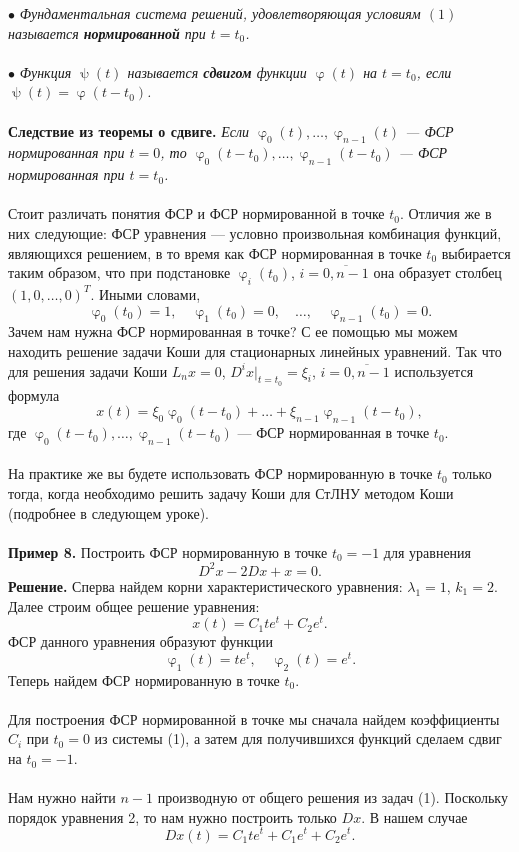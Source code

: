 \documentclass[a4paper, 12pt]{article}
\renewcommand{\varphi}{\upvarphi}
\renewcommand{\psi}{\uppsi}
\begin{document}
$\bullet$ \textit{Фундаментальная система решений, удовлетворяющая условиям $(1)$ называется \textbf{нормированной} при $t = t_0$.}\\\\
$\bullet$ \textit{Функция $\psi(t)$ называется \textbf{сдвигом} функции $\varphi(t)$ на $t=t_0$, если $\psi(t) = \varphi(t-t_0)$.}\\\\
\textbf{Следствие из теоремы о сдвиге.} \textit{Если $\varphi_0(t),\ldots,\varphi_{n-1}(t)$ --- ФСР нормированная при $t=0$, то $\varphi_0(t-t_0),\ldots,\varphi_{n-1}(t-t_0)$ --- ФСР нормированная при $t=t_0$.}\\\\
Стоит различать понятия ФСР и ФСР нормированной в точке $t_0$. Отличия же в них следующие: ФСР уравнения --- условно произвольная комбинация функций, являющихся решением, в то время как ФСР нормированная в точке $t_0$ выбирается таким образом, что при подстановке $\varphi_i(t_0)$, $i = \overline{0, n-1}$ она образует столбец $(1, 0, \ldots, 0)^T$. Иными словами, $$\varphi_0(t_0) = 1,\quad \varphi_1(t_0) = 0,\quad\ldots ,\quad \varphi_{n-1}(t_0) = 0.$$
Зачем нам нужна ФСР нормированная в точке? С ее помощью мы можем находить решение задачи Коши для стационарных линейных уравнений. Так что для решения задачи Коши $L_nx = 0$, $D^ix|_{t=t_0} = \xi_i$, $i = \overline{0, n-1}$ используется формула $$x(t) = \xi_0\varphi_0(t-t_0) + \ldots + \xi_{n-1}\varphi_{n-1}(t-t_0),$$
где $\varphi_0(t-t_0),\ldots,\varphi_{n-1}(t-t_0)$ --- ФСР нормированная в точке $t_0$.\\\\
На практике же вы будете использовать ФСР нормированную в точке $t_0$ только тогда, когда необходимо решить задачу Коши для СтЛНУ методом Коши (подробнее в следующем уроке).\\\\
\textbf{Пример 8.}  Построить ФСР нормированную в точке $t_0 = -1$ для уравнения $$D^2x -2Dx + x = 0.$$
\textbf{Решение.} Сперва найдем корни характеристического уравнения: $\lambda_1 = 1$, $k_1 = 2$. Далее строим общее решение уравнения: $$x(t) = C_1te^t + C_2e^t.$$
ФСР данного уравнения образуют функции $$\varphi_1(t) = te^t,\quad \varphi_2(t) = e^t.$$ Теперь найдем ФСР нормированную в точке $t_0$.\\\\
Для построения ФСР нормированной в точке мы сначала найдем коэффициенты $C_i$ при $t_0 = 0$ из системы (1), а затем для получившихся функций сделаем сдвиг на $t_0 = -1$.\\\\ Нам нужно найти $n-1$ производную от общего решения из задач (1). Поскольку порядок уравнения 2, то нам нужно построить только $Dx$. В нашем случае $$Dx(t) = C_1te^t + C_1e^t + C_2e^t.$$
\end{document}
